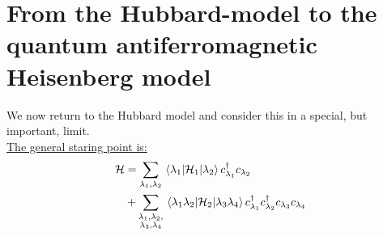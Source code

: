\chapter{From the Hubbard-model to the quantum antiferromagnetic Heisenberg model}

We now return to the Hubbard model and consider this in a special, but important, limit.\\

\underline{The general staring point is:}
\begin{align}
\begin{split}
    \mathcal{H} &= \sum_{\lambda_1,\lambda_2} \mel{\lambda_1}{\mathcal{H}_1}{\lambda_2}c_{\lambda_1}^{\dagger} c_{\lambda_2} \\
    &+ \sum_{\substack{\lambda_1, \lambda_2, \\
    \lambda_3, \lambda_4}} \mel{\lambda_1 \lambda_2}{\mathcal{H}_2}{\lambda_3 \lambda_4}c_{\lambda_1}^\dagger c_{\lambda_2}^\dagger c_{\lambda_3} c_{\lambda_4}
\end{split}
\end{align}

